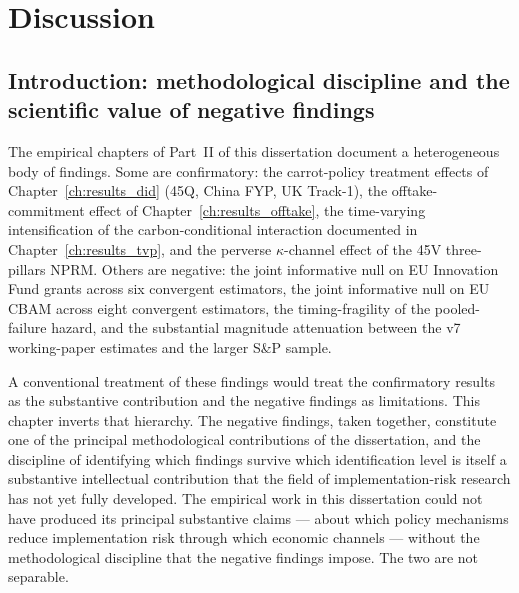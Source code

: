 \chapter{Discussion}
\label{ch:discussion}

\section{Introduction: methodological discipline and the scientific value of negative findings}
\label{sec:ch10-intro}

The empirical chapters of Part~II of this dissertation document a heterogeneous body of findings. Some are confirmatory: the carrot-policy treatment effects of Chapter~\ref{ch:results_did} (45Q, China FYP, UK Track-1), the offtake-commitment effect of Chapter~\ref{ch:results_offtake}, the time-varying intensification of the carbon-conditional interaction documented in Chapter~\ref{ch:results_tvp}, and the perverse $\kappa$-channel effect of the 45V three-pillars NPRM. Others are negative: the joint informative null on EU Innovation Fund grants across six convergent estimators, the joint informative null on EU CBAM across eight convergent estimators, the timing-fragility of the pooled-failure hazard, and the substantial magnitude attenuation between the v7 working-paper estimates and the larger S\&P sample.

A conventional treatment of these findings would treat the confirmatory results as the substantive contribution and the negative findings as limitations. This chapter inverts that hierarchy. The negative findings, taken together, constitute one of the principal methodological contributions of the dissertation, and the discipline of identifying which findings survive which identification level is itself a substantive intellectual contribution that the field of implementation-risk research has not yet fully developed. The empirical work in this dissertation could not have produced its principal substantive claims --- about which policy mechanisms reduce implementation risk through which economic channels --- without the methodological discipline that the negative findings impose. The two are not separable.

